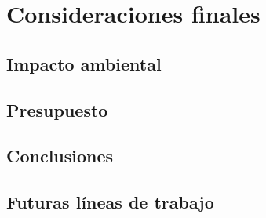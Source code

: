 \chapter{Consideraciones finales}

\section{Impacto ambiental}

\newpage
\section{Presupuesto}

\newpage
\section{Conclusiones}

\newpage
\section{Futuras líneas de trabajo}
